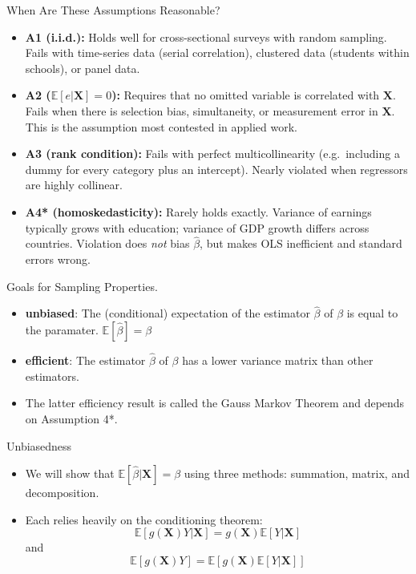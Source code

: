 \documentclass[aspectratio=169, handout]{beamer}
\numberwithin{equation}{section}
\begin{document}
\begin{frame}{When Are These Assumptions Reasonable?}
\begin{itemize}
\item \textbf{A1 (i.i.d.):} Holds well for cross-sectional surveys with random sampling. Fails with time-series data (serial correlation), clustered data (students within schools), or panel data.\pause
\item \textbf{A2 ($\mathbb{E}[e|\bm{X}]=0$):} Requires that no omitted variable is correlated with $\bm{X}$. Fails when there is selection bias, simultaneity, or measurement error in $\bm{X}$. This is the assumption most contested in applied work.\pause
\item \textbf{A3 (rank condition):} Fails with perfect multicollinearity (e.g.\ including a dummy for every category plus an intercept). Nearly violated when regressors are highly collinear.\pause
\item \textbf{A4* (homoskedasticity):} Rarely holds exactly. Variance of earnings typically grows with education; variance of GDP growth differs across countries. Violation does \emph{not} bias $\hat{\beta}$, but makes OLS inefficient and standard errors wrong.
\end{itemize}
\end{frame}

\begin{frame}{Goals for Sampling Properties.}
\begin{itemize}
\item \textbf{unbiased}: The (conditional) expectation of the estimator $\hat{\beta}$ of $\beta$ is equal to the paramater.  $\mathbb{E}[\hat{\beta}]=\beta$
\item \textbf{efficient}: The estimator $\hat{\beta}$ of $\beta$ has a lower variance matrix than other estimators.
\item The latter efficiency result is called the Gauss Markov Theorem and depends on Assumption 4*.
\end{itemize}
\end{frame}

\begin{frame}{Unbiasedness}
\begin{itemize}
\item We will show that $\mathbb{E}[\hat{\beta}|\bm{X}]=\beta$ using three methods: summation, matrix, and decomposition.
\item Each relies heavily on the conditioning theorem:
$$\mathbb{E}[g(\bm{X})Y|\bm{X}]=g(\bm{X})\mathbb{E}[Y|\bm{X}]$$
and
$$\mathbb{E}[g(\bm{X})Y]=\mathbb{E}[g(\bm{X})\mathbb{E}[Y|\bm{X}]]$$

\end{itemize}
\end{frame}
\end{document}
